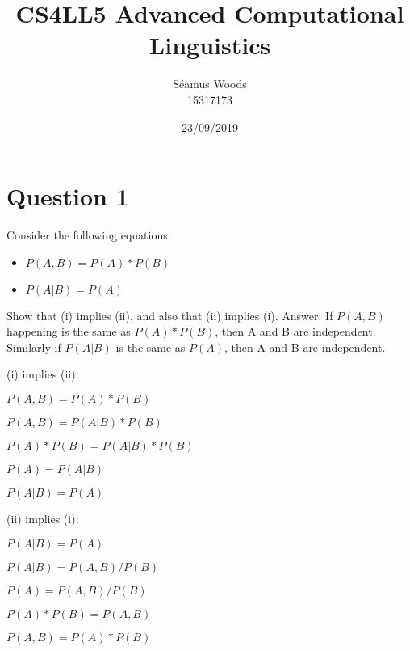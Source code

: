 \documentclass[12pt]{report}
\title{CS4LL5
 Advanced Computational Linguistics}
\author{Séamus Woods \\ 15317173}
\date{23/09/2019}
\begin{document}
\maketitle
\newpage

\section{Question 1}
Consider the following equations:
\begin{itemize}
\item[i]
$P(A,B) = P(A) * P(B)$
\item[ii]
$P(A|B) = P(A)$
\end{itemize}
Show that (i) implies (ii), and also that (ii) implies (i).
\newline
\newline
Answer:
\newline
If $P(A,B)$ happening is the same as $P(A) * P(B)$, then A and B are independent. Similarly if $P(A|B)$ is the same as $P(A)$, then A and B are independent.
\begin{center}
(i) implies (ii):
\end{center}
\begin{center}
$P(A,B) = P(A) * P(B)$
\end{center}
\begin{center}
$P(A,B) = P(A|B) * P(B)$
\end{center}
\begin{center}
$P(A) * P(B) = P(A|B) * P(B)$
\end{center}
\begin{center}
$P(A) = P(A|B)$
\end{center}
\begin{center}
$P(A|B) = P(A)$
\end{center}
\begin{center}
\end{center}
\begin{center}
(ii) implies (i):
\end{center}
\begin{center}
$P(A|B) = P(A)$
\end{center}
\begin{center}
$P(A|B) = P(A,B) / P(B)$
\end{center}
\begin{center}
$P(A) = P(A,B) / P(B)$
\end{center}
\begin{center}
$P(A) * P(B) = P(A,B)$
\end{center}
\begin{center}
$P(A,B) = P(A) * P(B)$
\end{center}
\end{document}
